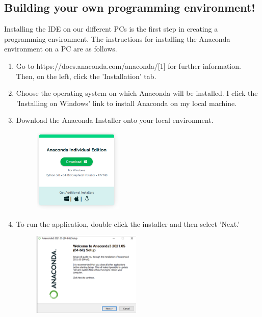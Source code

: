 \documentclass[conference]{IEEEtran}
\begin{document}
\subsection{Building your own programming environment!}
Installing the IDE on our different PCs is the first step in creating a programming environment. The instructions for installing the Anaconda environment on a PC are as follows.
\begin{enumerate}
    \item 
   Go to https://docs.anaconda.com/anaconda/[1] for further information. Then, on the left, click the 'Installation' tab.

    \item Choose the operating system on which Anaconda will be installed. I click the 'Installing on Windows' link to install Anaconda on my local machine.

\item Download the Anaconda Installer onto your local environment.
\begin{figure}[!htbp]
    \centering
    \includegraphics[height=4cm]{Task1 Step3.png}
   
    \label{fig:my_label}
\end{figure}
\begin{figure}[!htbp]
    \centering
    
\end{figure}

 \item To run the application, double-click the installer and then select 'Next.'
\begin{figure}[!htbp]
    \centering
    \includegraphics[height=4cm]{task4.png}
   

\end{figure}
\end{enumerate}
\end{document}
